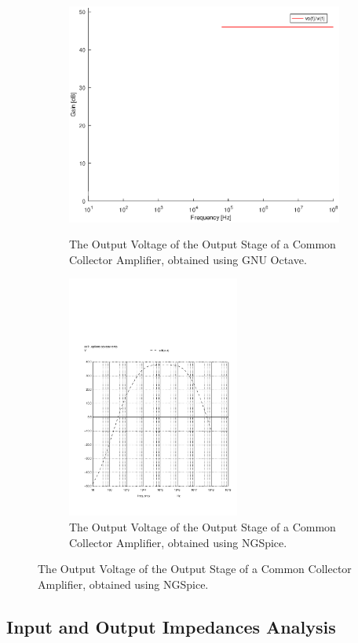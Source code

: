 \begin{figure}[H]
\begin{subfigure}{0.5\textwidth}
\includegraphics[width=0.9\linewidth, height=8cm]{gain.eps} 
\caption{The Output Voltage of the Output Stage of a Common Collector Amplifier, obtained using GNU Octave.}
\label{fig:theo_third}
\end{subfigure}
\begin{subfigure}{0.5\textwidth}
\includegraphics[width=0.8\linewidth, height=8cm]{vo2f.pdf}
\caption{The Output Voltage of the Output Stage of a Common Collector Amplifier, obtained using NGSpice.}
\label{fig:total}
\end{subfigure}
\end{figure}


\subsection{Input and Output Impedances Analysis}
\label{subsec:freqresp}

